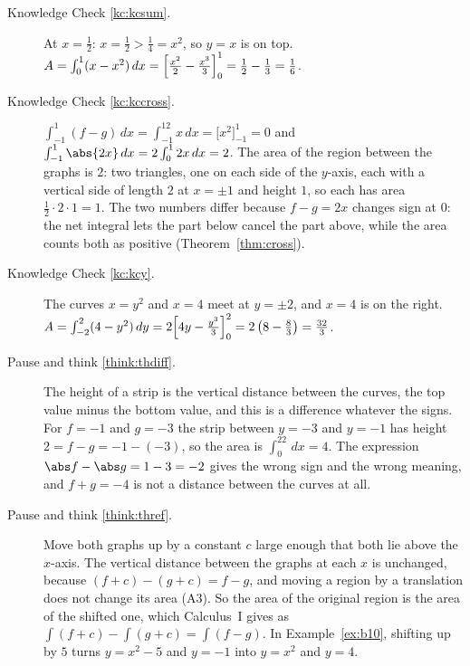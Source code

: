 \documentclass[11pt]{article}
\begin{document}
\begin{description}

  \item[Knowledge Check \ref{kc:kcsum}.] At $x=\frac12$: $x=\frac12>\frac14=x^2$, so $y=x$ is on top. $A=\int_0^1(x-x^2)\,dx=\Bigl[\frac{x^2}2-\frac{x^3}3\Bigr]_0^1=\frac12-\frac13=\frac16$.

  \item[Knowledge Check \ref{kc:kccross}.] $\int_{-1}^1(f-g)\,dx=\int_{-1}^12x\,dx=\bigl[x^2\bigr]_{-1}^1=0$ and $\int_{-1}^1\abs{2x}\,dx=2\int_0^12x\,dx=2$. The area of the region between the graphs is $2$: two triangles, one on each side of the $y$-axis, each with a vertical side of length $2$ at $x=\pm1$ and height $1$, so each has area $\frac12\cdot2\cdot1=1$. The two numbers differ because $f-g=2x$ changes sign at $0$: the net integral lets the part below cancel the part above, while the area counts both as positive (Theorem~\ref{thm:cross}).

  \item[Knowledge Check \ref{kc:kcy}.] The curves $x=y^2$ and $x=4$ meet at $y=\pm2$, and $x=4$ is on the right. $A=\int_{-2}^2(4-y^2)\,dy=2\Bigl[4y-\frac{y^3}3\Bigr]_0^2=2\left(8-\frac83\right)=\frac{32}3$.

  \item[Pause and think \ref{think:thdiff}.] The height of a strip is the vertical distance between the curves, the top value minus the bottom value, and this is a difference whatever the signs. For $f=-1$ and $g=-3$ the strip between $y=-3$ and $y=-1$ has height $2=f-g=-1-(-3)$, so the area is $\int_0^22\,dx=4$. The expression $\abs f-\abs g=1-3=-2$ gives the wrong sign and the wrong meaning, and $f+g=-4$ is not a distance between the curves at all.

  \item[Pause and think \ref{think:thref}.] Move both graphs up by a constant $c$ large enough that both lie above the $x$-axis. The vertical distance between the graphs at each $x$ is unchanged, because $(f+c)-(g+c)=f-g$, and moving a region by a translation does not change its area (A3). So the area of the original region is the area of the shifted one, which Calculus~I gives as $\int(f+c)-\int(g+c)=\int(f-g)$. In Example~\ref{ex:b10}, shifting up by $5$ turns $y=x^2-5$ and $y=-1$ into $y=x^2$ and $y=4$.


\end{description}
\end{document}
